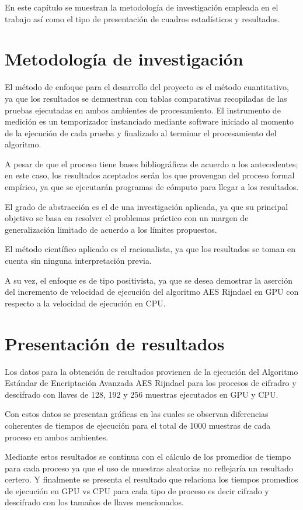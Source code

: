 \documentclass[../main/main.tex]{subfiles}
\begin{document}
\espacio
  En este capítulo se muestran la metodología de investigación empleada en el trabajo así como el tipo de presentación de cuadros estadísticos y resultados.

  \section{Metodología de investigación}

  El método de enfoque para el desarrollo del proyecto es el método cuantitativo, ya que los resultados se demuestran con tablas comparativas recopiladas de las pruebas ejecutadas en ambos ambientes de procesamiento. El instrumento de medición es un temporizador instanciado mediante software iniciado al momento de la ejecución de cada prueba y finalizado al terminar el procesamiento del algoritmo.

  A pesar de que el proceso tiene bases bibliográficas de acuerdo a los antecedentes; en este caso, los resultados aceptados serán los que provengan del proceso formal empírico, ya que se ejecutarán programas de cómputo para llegar a los resultados.

  El grado de abstracción es el de una investigación aplicada, ya que su principal objetivo se basa en resolver el problemas práctico con un margen de generalización limitado de acuerdo a los límites propuestos.

  El método científico aplicado es el racionalista, ya que los resultados se toman en cuenta sin ninguna interpretación previa.

  A su vez, el enfoque es de tipo positivista, ya que se desea demostrar la aserción del incremento de velocidad de ejecución del algoritmo AES Rijndael en GPU con respecto a la velocidad de ejecución en CPU.

  \section{Presentación de resultados}

  Los datos para la obtención de resultados provienen de la ejecución del Algoritmo Estándar de Encriptación Avanzada AES Rijndael para los procesos de cifradro y descifrado con llaves de 128, 192 y 256 muestras ejecutados en GPU y CPU.

  Con estos datos se presentan gráficas en las cuales se observan diferencias coherentes de tiempos de ejecución para el total de 1000 muestras de cada proceso en ambos ambientes.

  Mediante estos resultados se continua con el cálculo de los promedios de tiempo para cada proceso ya que el uso de muestras aleatorias no reflejaría un resultado certero. Y finalmente se presenta el resultado que relaciona los tiempos promedios de ejecución en GPU vs CPU para cada tipo de proceso es decir cifrado y descifrado con los tamaños de llaves mencionados.
\end{document}
